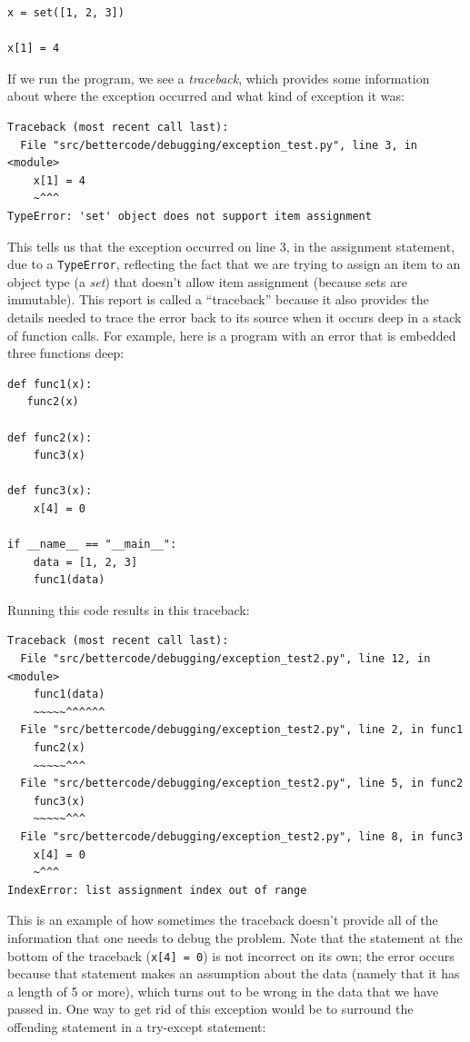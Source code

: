 \begin{lstlisting}[style=Pythonshort]
x = set([1, 2, 3])

x[1] = 4
\end{lstlisting}

If we run the program, we see a \textit{traceback}, which provides some information about where the exception occurred and what kind of exception it was:

\begin{lstlisting}[style=shell]
Traceback (most recent call last):
  File "src/bettercode/debugging/exception_test.py", line 3, in <module>
    x[1] = 4
    ~^^^
TypeError: 'set' object does not support item assignment
\end{lstlisting}

This tells us that the exception occurred on line 3, in the assignment statement, due to a \texttt{TypeError}, reflecting the fact that we are trying to assign an item to an object type (a \textit{set}) that doesn't allow item assignment (because sets are immutable). This report is called a ``traceback'' because it also provides the details needed to trace the error back to its source when it occurs deep in a stack of function calls. For example, here is a program with an error that is embedded three functions deep:

\begin{lstlisting}[style=Python]
def func1(x):
   func2(x)

def func2(x):
    func3(x)

def func3(x):
    x[4] = 0

if __name__ == "__main__":
    data = [1, 2, 3]
    func1(data)
\end{lstlisting}

Running this code results in this traceback:

\begin{lstlisting}[style=shell]
Traceback (most recent call last):
  File "src/bettercode/debugging/exception_test2.py", line 12, in <module>
    func1(data)
    ~~~~~^^^^^^
  File "src/bettercode/debugging/exception_test2.py", line 2, in func1
    func2(x)
    ~~~~~^^^
  File "src/bettercode/debugging/exception_test2.py", line 5, in func2
    func3(x)
    ~~~~~^^^
  File "src/bettercode/debugging/exception_test2.py", line 8, in func3
    x[4] = 0
    ~^^^
IndexError: list assignment index out of range
\end{lstlisting}

This is an example of how sometimes the traceback doesn't provide all of the information that one needs to debug the problem.  Note that the statement at the bottom of the traceback (\texttt{x[4] = 0}) is not incorrect on its own; the error occurs because that statement makes an assumption about the data (namely that it has a length of 5 or more), which turns out to be wrong in the data that we have passed in.  One way to get rid of this exception would be to surround the offending statement in a try-except statement:

